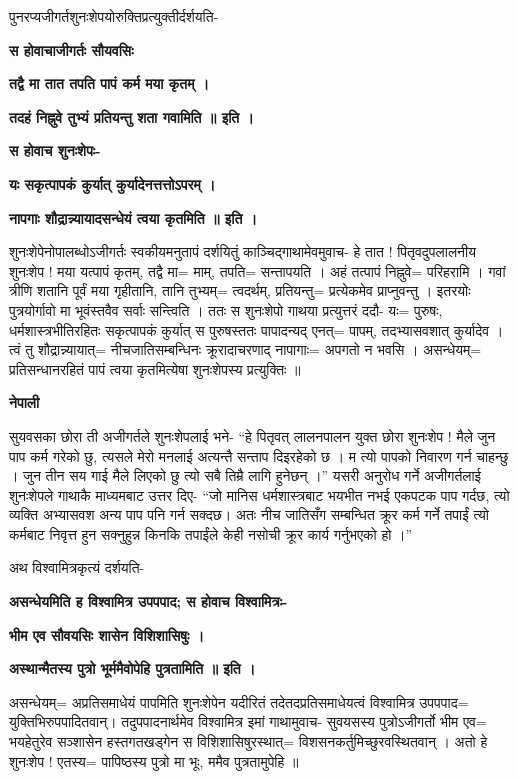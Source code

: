 \documentclass[11pt, a5paper]{article}
\begin{document}
पुनरप्यजीगर्तशुनःशेपयोरुक्तिप्रत्युक्तीर्दर्शयति-

\textbf{स होवाचाजीगर्तः सौयवसिः}

\textbf{तद्वै मा तात तपति पापं कर्म मया कृतम् ।}

\textbf{तदहं निह्नुवे तुभ्यं प्रतियन्तु शता गवामिति ॥ इति ।}

\textbf{स होवाच शुनःशेपः-}

\textbf{यः सकृत्पापकं कुर्यात् कुर्यादेनत्तत्तोऽपरम् ।}

\textbf{नापगाः शौद्रान्न्यायादसन्धेयं त्वया कृतमिति ॥ इति ।}

शुनःशेपेनोपालब्धोऽजीगर्तः स्वकीयमनुतापं दर्शयितुं काञ्चिद्गाथामेवमुवाच-  हे तात ! पितृवदुपलालनीय शुनःशेप ! मया यत्पापं कृतम्, तद्वै मा= माम्, तपति= सन्तापयति । अहं तत्पापं निह्नुवे= परिहरामि । गवां त्रीणि शतानि पूर्वं मया गृहीतानि, तानि तुभ्यम्= त्वदर्थम्, प्रतियन्तु= प्रत्येकमेव प्राप्नुवन्तु । इतरयोः पुत्रयोर्गावो मा भूवंस्तवैव सर्वाः सन्त्विति । ततः स शुनःशेपो गाथया प्रत्युत्तरं ददौ- यः= पुरुषः, धर्मशास्त्रभीतिरहितः सकृत्पापकं कुर्यात् स पुरुषस्ततः पापादन्यद् एनत्= पापम्, तदभ्यासवशात् कुर्यादेव । त्वं तु शौद्रान्न्यायात्= नीचजातिसम्बन्धिनः क्रूरादाचरणाद् नापागाः= अपगतो न भवसि । असन्धेयम्= प्रतिसन्धानरहितं पापं त्वया कृतमित्येषा शुनःशेपस्य प्रत्युक्तिः ॥

\textbf{नेपाली}

सुयवसका छोरा ती अजीगर्तले शुनःशेपलाई भने- “हे पितृवत् लालनपालन युक्त छोरा शुनःशेप ! मैले जुन पाप कर्म गरेको छु, त्यसले मेरो मनलाई अत्यन्तै सन्ताप दिइरहेको छ । म त्यो पापको निवारण गर्न चाहन्छु । जुन तीन सय गाई मैले लिएको छु त्यो सबै तिम्रै लागि हुनेछन् ।” यसरी अनुरोध गर्ने अजीगर्तलाई शुनःशेपले गाथाकै माध्यमबाट उत्तर दिए- “जो मानिस धर्मशास्त्रबाट भयभीत नभई एकपटक पाप गर्दछ, त्यो व्यक्ति अभ्यासवश अन्य पाप पनि गर्न सक्दछ। अतः नीच जातिसँग सम्बन्धित क्रूर कर्म गर्ने तपाईं त्यो कर्मबाट निवृत्त हुन सक्नुहुन्न किनकि तपाईंले केही नसोची क्रूर कार्य गर्नुभएको हो ।”

अथ विश्वामित्रकृत्यं दर्शयति-

\textbf{असन्धेयमिति ह विश्वामित्र उपपपाद; स होवाच विश्वामित्रः-}

\textbf{भीम एव सौवयसिः शासेन विशिशासिषुः ।}

\textbf{अस्थान्मैतस्य पुत्रो भूर्ममैवोपेहि पुत्रतामिति ॥ इति ।}

असन्धेयम्= अप्रतिसमाधेयं पापमिति शुनःशेपेन यदीरितं तदेतदप्रतिसमाधेयत्वं विश्वामित्र उपपपाद= युक्तिभिरुपपादितवान्। तदुपपादनार्थमेव विश्वामित्र इमां गाथामुवाच- सुवयसस्य पुत्रोऽजीगर्तो भीम एव= भयहेतुरेव सञ्शासेन हस्तगतखड्‌गेन स विशिशासिषुरस्थात्= विशसनकर्तुमिच्छुरवस्थितवान् । अतो हे शुनःशेप ! एतस्य= पापिष्ठस्य पुत्रो मा भूः, ममैव पुत्रतामुपेहि ॥
\end{document}
